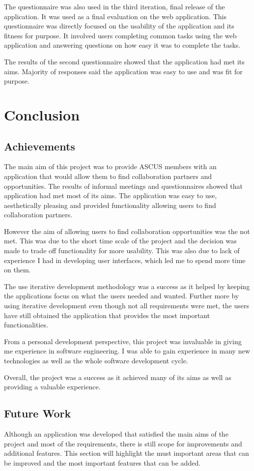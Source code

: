 \documentclass[a4paper,oneside,11pt]{report}
\begin{document}
The questionnaire was also used in the third iteration, final release of the application. It was used as a final evaluation on the web application. This questionnaire was directly focused on the usability of the application and its fitness for purpose. It involved users completing common tasks using the web application and answering questions on how easy it was to complete the tasks.

The results of the second questionnaire showed that the application had met its aims. Majority of responses said the application was easy to use and was fit for purpose.

\chapter{Conclusion}
\section{Achievements}
The main aim of this project was to provide ASCUS members with an application that would allow them to find collaboration partners and opportunities. The results of informal meetings and questionnaires showed that application had met most of its aims. The application was easy to use, aesthetically pleasing and provided functionality allowing users to find collaboration partners.

However the aim of allowing users to find collaboration opportunities was the not met. This was due to the short time scale of the project and the decision was made to trade off functionality for more usability. This was also due to lack of experience I had in developing user interfaces, which led me to spend more time on them. 

The use iterative development methodology was a success as it helped by keeping the applications focus on what the users needed and wanted. Further more by using iterative development even though not all requirements were met, the users have still obtained the application that provides the most important functionalities.

From a personal development perspective, this project was invaluable in giving me experience in software engineering. I was able to gain experience in many new technologies as well as the whole software development cycle.

Overall, the project was a success as it achieved many of its aims as well as providing a valuable experience.


\section{Future Work}
Although an application was developed that satisfied the main aims of the project and most of the requirements, there is still scope for improvements and additional features. This section will highlight the must	important areas that can be improved and the most important features that can be added.
\end{document}
